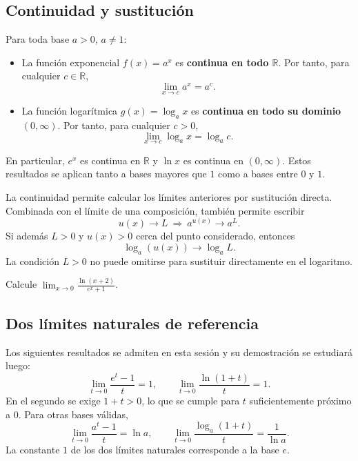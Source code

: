 \documentclass[10pt,a5paper]{article}
\newif\ifmostrarSoluciones
\begin{document}
\subsection*{Continuidad y sustitución}
\begin{teorema}
Para toda base $a>0$, $a\neq1$:
\begin{itemize}
  \item La función exponencial $f(x)=a^x$ es \textbf{continua en todo $\mathbb{R}$}. Por tanto, para cualquier $c\in\mathbb{R}$,
  \[
    \lim_{x\to c}a^x=a^c.
  \]
  \item La función logarítmica $g(x)=\log_a x$ es \textbf{continua en todo su dominio $(0,\infty)$}. Por tanto, para cualquier $c>0$,
  \[
    \lim_{x\to c}\log_a x=\log_a c.
  \]
\end{itemize}
En particular, $e^x$ es continua en $\mathbb{R}$ y $\ln x$ es continua en $(0,\infty)$. Estos resultados se aplican tanto a bases mayores que $1$ como a bases entre $0$ y $1$.
\end{teorema}

La continuidad permite calcular los límites anteriores por sustitución directa. Combinada con el límite de una composición, también permite escribir
\[
  u(x)\to L\ \Longrightarrow\ a^{u(x)}\to a^L.
\]
Si además $L>0$ y $u(x)>0$ cerca del punto considerado, entonces
\[
  \log_a(u(x))\longrightarrow\log_a L.
\]
La condición $L>0$ no puede omitirse para sustituir directamente en el logaritmo.

\begin{ejemplo}
Calcule $\displaystyle\lim_{x\to0}\frac{\ln(x+2)}{e^x+1}$.
\end{ejemplo}
\ifmostrarSoluciones
\begin{solucion}
El numerador está definido y es continuo para $x>-2$. El denominador es continuo, positivo y en $0$ vale $2$. Por tanto, el límite es $\ln2/2$.
\end{solucion}
\else\vspace{14mm}\fi

\subsection*{Dos límites naturales de referencia}
Los siguientes resultados se admiten en esta sesión y su demostración se estudiará luego:
\[
  \boxed{\lim_{t\to0}\frac{e^t-1}{t}=1},\qquad
  \boxed{\lim_{t\to0}\frac{\ln(1+t)}{t}=1}.
\]
En el segundo se exige $1+t>0$, lo que se cumple para $t$ suficientemente próximo a $0$. Para otras bases válidas,
\[
  \lim_{t\to0}\frac{a^t-1}{t}=\ln a,\qquad
  \lim_{t\to0}\frac{\log_a(1+t)}{t}=\frac1{\ln a}.
\]
La constante $1$ de los dos límites naturales corresponde a la base $e$.
\end{document}
